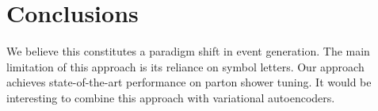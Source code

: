 \section{Conclusions}\label{sec:conclusions}

We believe this constitutes a paradigm shift in event generation. The
main limitation of this approach is its reliance on symbol letters. Our
approach achieves state-of-the-art performance on parton shower tuning.
It would be interesting to combine this approach with variational
autoencoders.

